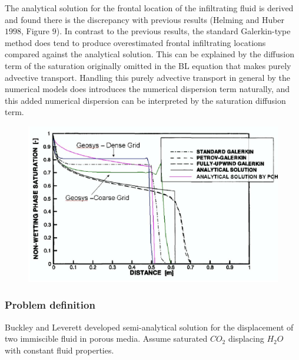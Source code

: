The analytical solution for the frontal location of the infiltrating fluid is derived and found there is the discrepancy with previous results (Helming and Huber $1998$, Figure $9$). In contrast to the previous results, the standard Galerkin-type method does tend to produce overestimated frontal infiltrating locations compared against the analytical solution. This can be explained by the diffusion term of the saturation originally omitted in the BL equation that makes purely advective transport. Handling this purely advective transport in general by the numerical models does introduces the numerical dispersion term naturally, and this added numerical dispersion can be interpreted by the saturation diffusion term.
\begin{figure}[!thb]
\begin{center}
\includegraphics[scale=0.5]{HH/figures/PSSequential.eps}
\end{center}
\vspace{-5.0cm}
\caption{}
\label{bls:comparison}
\end{figure}
\subsubsection*{\upshape\textbf{Problem definition}}
\hspace*{0.25cm} Buckley and Leverett developed semi-analytical solution for the displacement of two immiscible fluid in porous media. Assume saturated $CO_2$ displacing $H_2O$ with constant fluid properties.
